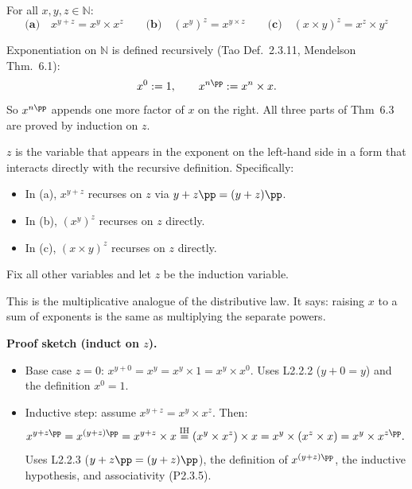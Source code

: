
\begin{tcolorbox}[colback=propbox, colframe=propborder, arc=2pt,
  left=6pt, right=6pt, top=4pt, bottom=4pt,
  title={\small\textbf{Theorem 6.3 — Basic Properties of Exponentiation
    \normalfont(\srccite{MendelsonNumberSystemsFoundationsAnalysis}{Ch.~2, \S2.6, Theorem~6.3})}},
  fonttitle=\small\bfseries]
For all $x, y, z \in \mathbb{N}$:
\[
\textbf{(a)}\quad x^{y+z} = x^y \times x^z
\qquad
\textbf{(b)}\quad (x^y)^z = x^{y \times z}
\qquad
\textbf{(c)}\quad (x \times y)^z = x^z \times y^z
\]
\end{tcolorbox}

\begin{remark}
Exponentiation on $\mathbb{N}$ is defined recursively (Tao Def.~2.3.11,
Mendelson Thm.~6.1):
\[
x^0 := 1,
\qquad
x^{n\pp} := x^n \times x.
\]
So $x^{n\pp}$ appends one more factor of $x$ on the right.
All three parts of Thm~6.3 are proved by induction on $z$.
\end{remark}

\begin{remark}
$z$ is the variable that appears in the exponent on the
left-hand side in a form that interacts directly with the recursive
definition. Specifically:
\begin{itemize}
  \item In (a), $x^{y+z}$ recurses on $z$ via $y + z\pp = (y+z)\pp$.
  \item In (b), $(x^y)^z$ recurses on $z$ directly.
  \item In (c), $(x \times y)^z$ recurses on $z$ directly.
\end{itemize}
Fix all other variables and let $z$ be the induction variable.
\end{remark}

\begin{remark}[Part (a): $x^{y+z} = x^y \times x^z$ — the exponent addition law]
This is the multiplicative analogue of the distributive law.
It says: raising $x$ to a sum of exponents is the same as
multiplying the separate powers.

\medskip
\textbf{Proof sketch (induct on $z$).}
\begin{itemize}
  \item Base case $z = 0$: $x^{y+0} = x^y = x^y \times 1 = x^y \times x^0$.
    Uses L2.2.2 ($y+0=y$) and the definition $x^0 = 1$.
  \item Inductive step: assume $x^{y+z} = x^y \times x^z$. Then:
    \[
    x^{y+z\pp} = x^{(y+z)\pp} = x^{y+z} \times x
    \stackrel{\text{IH}}{=} (x^y \times x^z) \times x
    = x^y \times (x^z \times x) = x^y \times x^{z\pp}.
    \]
    Uses L2.2.3 ($y + z\pp = (y+z)\pp$), the definition of
    $x^{(y+z)\pp}$, the inductive hypothesis, and associativity (P2.3.5).
\end{itemize}
\end{remark}

